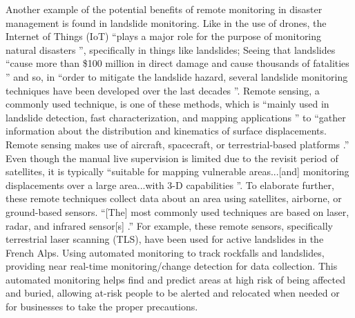 \documentclass[conference]{IEEEtran}
\begin{document}
Another example of the potential benefits of remote monitoring in disaster management is found in landslide
monitoring. Like in the use of drones, the Internet of Things (IoT) ``plays a major role for the purpose of
monitoring natural disasters \cite{b7}'', specifically in things like landslides; Seeing that landslides ``cause
more than \$100 million in direct damage and cause thousands of fatalities \cite{b7}'' and so, in ``order to
mitigate the landslide hazard, several landslide monitoring techniques have been developed over the last
decades \cite{b7}''.  Remote sensing, a commonly used technique, is one of these methods, which is ``mainly
used in landslide detection, fast characterization, and mapping applications \cite{b7}'' to ``gather
information about the distribution and kinematics of surface displacements. Remote sensing makes use of
aircraft, spacecraft, or terrestrial-based platforms \cite{b7}.'' Even though the manual live supervision
is limited due to the revisit period of satellites, it is typically ``suitable for mapping vulnerable
areas...[and] monitoring displacements over a large area...with 3-D capabilities \cite{b7}”. To elaborate
further, these remote techniques collect data about an area using satellites, airborne, or ground-based
sensors. ``[The] most commonly used techniques are based on laser, radar, and infrared sensor[s] \cite{b7}.''
For example, these remote sensors, specifically terrestrial laser scanning (TLS), have been used for active
landslides in the French Alps. Using automated monitoring to track rockfalls and landslides, providing near
real-time monitoring/change detection for data collection. This automated monitoring helps find and predict
areas at high risk of being affected and buried, allowing at-risk people to be alerted and relocated when
needed or for businesses to take the proper precautions.\par
\end{document}
